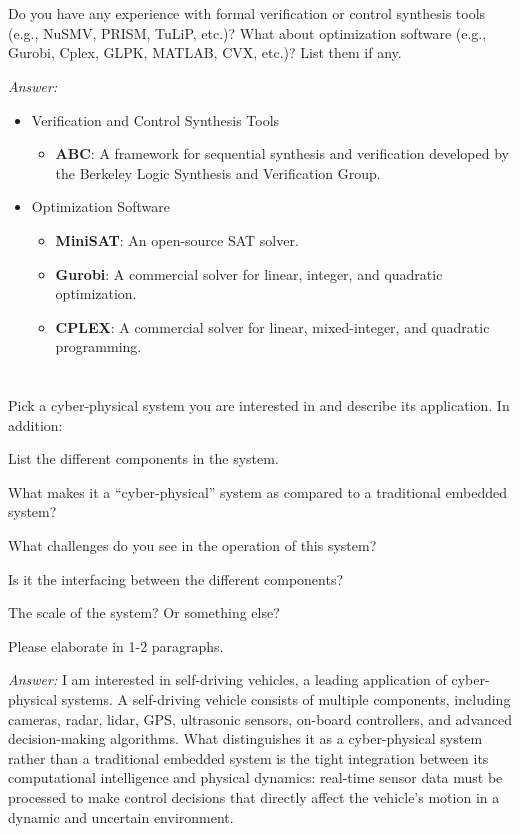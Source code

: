 \documentclass[a4paper]{article}
\begin{document}
\section{}
Do you have any experience with formal verification or control synthesis tools (e.g., NuSMV, PRISM, TuLiP, etc.)? What about optimization software (e.g., Gurobi, Cplex, GLPK, MATLAB, CVX, etc.)? List them if any.

\emph{Answer:} 
\begin{itemize}
    \item Verification and Control Synthesis Tools
        \begin{itemize}
            \item \textbf{ABC}: A framework for sequential synthesis and verification developed by the Berkeley Logic Synthesis and Verification Group.
        \end{itemize}
    \item Optimization Software
        \begin{itemize}
            \item \textbf{MiniSAT}: An open-source SAT solver.
            \item \textbf{Gurobi}: A commercial solver for linear, integer, and quadratic optimization.
            \item \textbf{CPLEX}: A commercial solver for linear, mixed-integer, and quadratic programming.
        \end{itemize}
\end{itemize}

\section{}
Pick a cyber-physical system you are interested in and describe its application. In addition:

List the different components in the system.

What makes it a “cyber-physical” system as compared to a traditional embedded system?

What challenges do you see in the operation of this system?

Is it the interfacing between the different components?

The scale of the system? Or something else?

Please elaborate in 1-2 paragraphs.

\emph{Answer:} 
I am interested in self-driving vehicles, a leading application of cyber-physical systems.
A self-driving vehicle consists of multiple components, including cameras, radar, lidar, GPS, ultrasonic sensors, on-board controllers, and advanced decision-making algorithms.
What distinguishes it as a cyber-physical system rather than a traditional embedded system is the tight integration between its computational intelligence and physical dynamics: real-time sensor data must be processed to make control decisions that directly affect the vehicle’s motion in a dynamic and uncertain environment.
\end{document}
